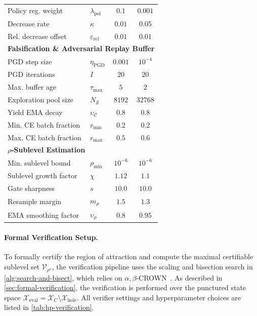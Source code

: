 \begin{table}[htbp]
\begin{tabular}{llcc}
        Policy reg. weight & $\lambda_{\mathrm{pol}}$ & $0.1$ & $0.001$ \\
        Decrease rate & $\kappa$ & $0.01$ & $0.05$ \\
        Rel. decrease offset & $\varepsilon_{\mathrm{rel}}$ & $0.01$ & $0.01$ \\
        \midrule
        \multicolumn{4}{l}{\textbf{Falsification \& Adversarial Replay Buffer}} \\
        \midrule
        PGD step size & $\eta_{\mathrm{PGD}}$ & $0.001$ & $10^{-4}$ \\
        PGD iterations & $I$ & $20$ & $20$ \\
        Max. buffer age & $\tau_{\max}$ & $5$ & $2$ \\
        Exploration pool size & $N_{\mathcal{S}}$ & $8192$ & $32768$ \\
        Yield EMA decay & $\upsilon_{\mathcal{C}}$ & $0.8$ & $0.8$ \\
        Min. CE batch fraction & $r_{\min}$ & $0.2$ & $0.2$\\
        Max. CE batch fraction & $r_{\max}$ & $0.5$ & $0.6$\\
        \midrule
        \multicolumn{4}{l}{\textbf{$\rho$-Sublevel Estimation}} \\
        \midrule
        Min. sublevel bound & $\rho_{\mathrm{min}}$ & $10^{-6}$ & $10^{-6}$ \\
        Sublevel growth factor & $\chi$ & $1.12$ & $1.1$ \\
        Gate sharpness & $s$ & $10.0$ & $10.0$ \\
        Resample margin & $m_\rho$ & $1.5$ & $1.3$ \\
        EMA smoothing factor & $\upsilon_\rho$ & $0.8$ & $0.95$ \\
        \bottomrule
    \end{tabular}
\end{table}


\paragraph{Formal Verification Setup.}
To formally certify the region of attraction and compute the maximal certifiable sublevel set $\mathcal{V}_{\rho^\star}$, 
the verification pipeline uses the scaling and bisection search in \cref{alg:search-and-bisect}, which relies on 
$\alpha,\beta$-CROWN~\cite{wang2021beta,xuFastCompleteEnabling2021}. 
As described in \cref{sec:formal-verification}, the verification is performed over the punctured state space 
$\mathcal{X}_{\mathrm{eval}} = \mathcal{X}_C \setminus \mathcal{X}_{\mathrm{hole}}$. 
All verifier settings and hyperparameter choices are listed in \cref{tab:hp-verification}.

